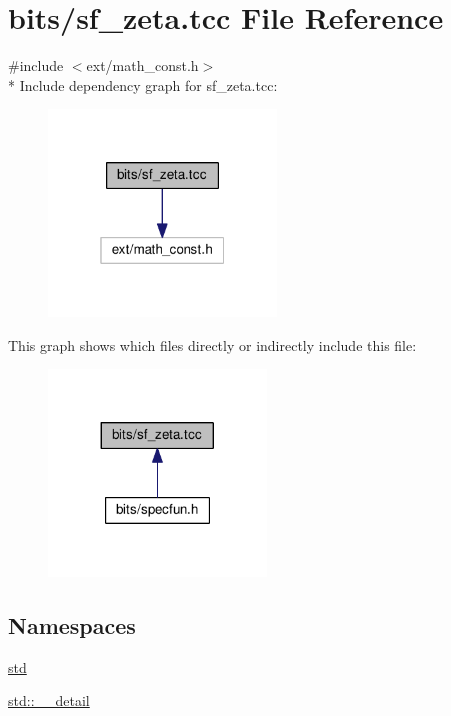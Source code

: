 \hypertarget{sf__zeta_8tcc}{}\section{bits/sf\+\_\+zeta.tcc File Reference}
\label{sf__zeta_8tcc}
{\ttfamily \#include $<$ext/math\+\_\+const.\+h$>$}\\*
Include dependency graph for sf\+\_\+zeta.\+tcc\+:
\nopagebreak
\begin{figure}[H]
\begin{center}
\leavevmode
\includegraphics[width=172pt]{sf__zeta_8tcc__incl}
\end{center}
\end{figure}
This graph shows which files directly or indirectly include this file\+:
\nopagebreak
\begin{figure}[H]
\begin{center}
\leavevmode
\includegraphics[width=164pt]{sf__zeta_8tcc__dep__incl}
\end{center}
\end{figure}
\subsection*{Namespaces}
\begin{DoxyCompactItemize}
\item 
 \hyperlink{namespacestd}{std}
\item 
 \hyperlink{namespacestd_1_1____detail}{std\+::\+\_\+\+\_\+detail}
\end{DoxyCompactItemize}
